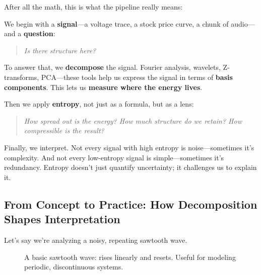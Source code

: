 After all the math, this is what the pipeline really means:

We begin with a \textbf{signal}—a voltage trace, a stock price curve, a chunk of audio—and a \textbf{question}:

\begin{quote}
\textit{Is there structure here?}
\end{quote}

To answer that, we \textbf{decompose} the signal. Fourier analysis, wavelets, Z-transforms, PCA—these tools help us express the signal in terms of \textbf{basis components}. This lets us \textbf{measure where the energy lives}.

Then we apply \textbf{entropy}, not just as a formula, but as a lens:

\begin{quote}
\textit{How spread out is the energy? How much structure do we retain? How compressible is the result?}
\end{quote}

Finally, we interpret. Not every signal with high entropy is noise—sometimes it’s complexity. And not every low-entropy signal is simple—sometimes it’s redundancy. Entropy doesn’t just quantify uncertainty; it challenges us to explain it.

\subsection{From Concept to Practice: How Decomposition Shapes Interpretation}

Let’s say we’re analyzing a noisy, repeating sawtooth wave. 

\begin{figure}[H]
\centering
{}
\caption{A basic sawtooth wave: rises linearly and resets. Useful for modeling periodic, discontinuous systems.}
\end{figure}


